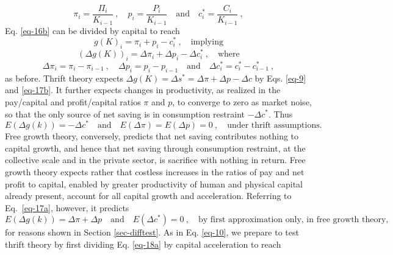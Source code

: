 \documentclass[a4paper,fleqn]{latex_styles/cas-sc}
\begin{document}
%
\begin{equation*}
\pi_i = \frac{\Pi_i}{K_{i - 1}} \ , \quad p_i = \frac{P_i}{K_{i-1}} \quad \text{and} \quad c^*_i = \frac{C_i}{K_{i-1}}\ ,
\end{equation*}
%
Eq. \eqref{eq-16b} can be divided by capital to reach
%
\begin{equation}
    g(K)_i = \pi_i + p_i - c^*_i\ , \quad \text{implying} \label{eq-16}
\end{equation}
\vspace{-5ex}
\begin{equation}
    (\Delta g(K))_i = \Delta \pi_i + \Delta p_i - \Delta c^*_i\ ,\quad \text{where}\label{eq-17a}
\end{equation}
\begin{equation*}
    \Delta \pi_i = \pi_i - \pi_{i - 1} \ , \quad \Delta p_i = p_i - p_{i - 1} \quad \text{and} \quad \Delta c^*_i = c^*_i - c^*_{i - 1}\ ,
\end{equation*}
%
as before. Thrift theory expects \(\Delta g(K) = \Delta s^* = \Delta \pi + \Delta p - \Delta c\) by Eqs. \eqref{eq-9} and \eqref{eq-17b}.
    It further expects changes in productivity, as realized in the pay/capital and profit/capital ratios \(\pi\) and \(p\), to converge to zero as market noise, so that the only source of net saving is in consumption restraint \(- \Delta c^*\). Thus
%
\begin{equation}
    E(\Delta g(k)) = - \Delta c^* \quad \text{and} \quad E(\Delta \pi) = E(\Delta p) = 0\ , \quad \text{under thrift assumptions.}\label{eq-18a}
\end{equation}
%
Free growth theory, conversely, predicts that net saving contributes nothing to capital growth, and hence that net saving through consumption restraint, at the collective scale and in the private sector, is sacrifice with nothing in return. Free growth theory expects rather that costless increases in the ratios of pay and net profit to capital, enabled by greater productivity of human and physical capital already present, account for all capital growth and acceleration. Referring to Eq.~\eqref{eq-17a}, however, it predicts
%
\begin{equation}
    E(\Delta g(k)) = \Delta \pi + \Delta p \quad \text{and} \quad E(\Delta c^*) = 0 \ , \quad \text{by first approximation only, in free growth theory,} \label{eq-19b}
\end{equation}
%
for reasons shown in Section \ref{sec-difftest}. As in Eq. \eqref{eq-10}, we prepare to test thrift theory by first dividing Eq. \eqref{eq-18a} by capital acceleration to reach
\end{document}
